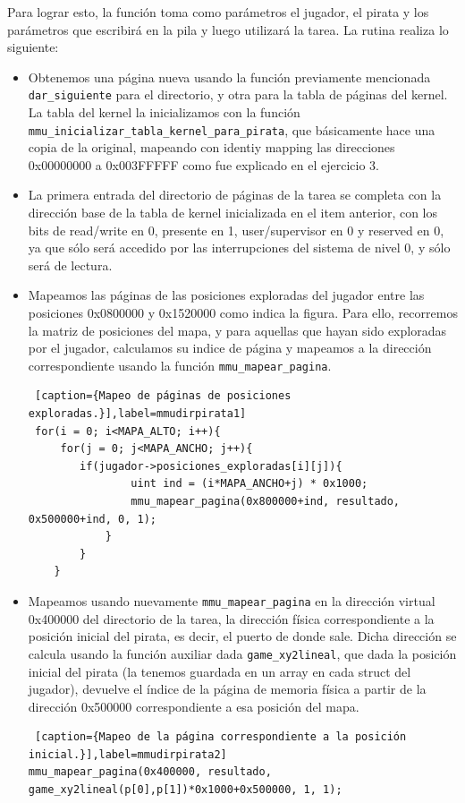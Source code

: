 \par Para lograr esto, la función toma como parámetros el jugador, el pirata y los parámetros que escribirá en la pila y luego utilizará la tarea. La rutina realiza lo siguiente:
\begin{itemize}
\item Obtenemos una página nueva usando la función previamente mencionada \texttt{dar_siguiente} para el directorio, y otra para la tabla de páginas del kernel. La tabla del kernel la inicializamos con la función \texttt{mmu_inicializar_tabla_kernel_para_pirata}, que básicamente hace una copia de la original, mapeando con identiy mapping las direcciones 0x00000000 a 0x003FFFFF como fue explicado en el ejercicio 3.

\item La primera entrada del directorio de páginas de la tarea se completa con la dirección base de la tabla de kernel inicializada en el item anterior, con los bits de read/write en 0, presente en 1, user/supervisor en 0 y reserved en 0, ya que sólo será accedido por las interrupciones del sistema de nivel 0, y sólo será de lectura.

\item Mapeamos las páginas de las posiciones exploradas del jugador entre las posiciones 0x0800000 y 0x1520000 como indica la figura. Para ello, recorremos la matriz de posiciones del mapa, y para aquellas que hayan sido exploradas por el jugador, calculamos su indice de página y mapeamos a la dirección correspondiente usando la función \texttt{mmu_mapear_pagina}.
\begin{lstlisting} [caption={Mapeo de páginas de posiciones exploradas.}],label=mmudirpirata1] 
 for(i = 0; i<MAPA_ALTO; i++){
     for(j = 0; j<MAPA_ANCHO; j++){
     	if(jugador->posiciones_exploradas[i][j]){
                uint ind = (i*MAPA_ANCHO+j) * 0x1000;
                mmu_mapear_pagina(0x800000+ind, resultado, 0x500000+ind, 0, 1);
            }
        }
    }
\end{lstlisting}

\item Mapeamos usando nuevamente \texttt{mmu_mapear_pagina} en la dirección virtual 0x400000 del directorio de la tarea, la dirección física correspondiente a la posición inicial del pirata, es decir, el puerto de donde sale. Dicha dirección se calcula usando la función auxiliar dada \texttt{game_xy2lineal}, que dada la posición inicial del pirata (la tenemos guardada en un array en cada struct del jugador), devuelve el índice de la página de memoria física a partir de la dirección 0x500000 correspondiente a esa posición del mapa.
\begin{lstlisting} [caption={Mapeo de la página correspondiente a la posición inicial.}],label=mmudirpirata2] 
mmu_mapear_pagina(0x400000, resultado, game_xy2lineal(p[0],p[1])*0x1000+0x500000, 1, 1);
\end{lstlisting}


\end{itemize}
